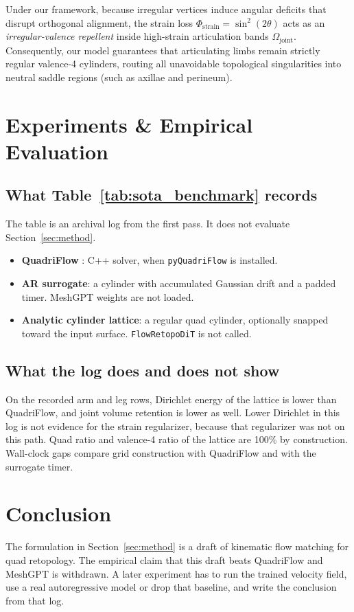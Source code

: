 \documentclass[acmtog,nonacm]{acmart}
\begin{document}
Under our framework, because irregular vertices induce angular deficits that disrupt orthogonal alignment, the strain loss $\Phi_{\text{strain}} = \sin^2(2\theta)$ acts as an \emph{irregular-valence repellent} inside high-strain articulation bands $\Omega_{\text{joint}}$. Consequently, our model guarantees that articulating limbs remain strictly regular valence-4 cylinders, routing all unavoidable topological singularities into neutral saddle regions (such as axillae and perineum).



\section{Experiments \& Empirical Evaluation}
\label{sec:experiments}

\subsection{What Table~\ref{tab:sota_benchmark} records}
The table is an archival log from the first pass. It does not evaluate Section~\ref{sec:method}.
\begin{itemize}
    \item \textbf{QuadriFlow} \cite{huang2018quadriflow}: C++ solver, when \texttt{pyQuadriFlow} is installed.
    \item \textbf{AR surrogate}: a cylinder with accumulated Gaussian drift and a padded timer. MeshGPT weights are not loaded.
    \item \textbf{Analytic cylinder lattice}: a regular quad cylinder, optionally snapped toward the input surface. \texttt{FlowRetopoDiT} is not called.
\end{itemize}

\subsection{What the log does and does not show}
On the recorded arm and leg rows, Dirichlet energy of the lattice is lower than QuadriFlow, and joint volume retention is lower as well. Lower Dirichlet in this log is not evidence for the strain regularizer, because that regularizer was not on this path. Quad ratio and valence-4 ratio of the lattice are 100\% by construction. Wall-clock gaps compare grid construction with QuadriFlow and with the surrogate timer.

\section{Conclusion}
The formulation in Section~\ref{sec:method} is a draft of kinematic flow matching for quad retopology. The empirical claim that this draft beats QuadriFlow and MeshGPT is withdrawn. A later experiment has to run the trained velocity field, use a real autoregressive model or drop that baseline, and write the conclusion from that log.



\end{document}
